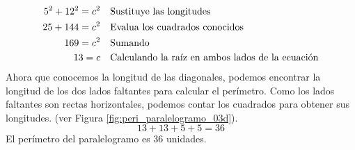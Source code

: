 \begin{solutionbox}{14cm}
\begin{minipage}{0.55\textwidth}
\begin{align*}
            5^2+12^2  =c^2 & \text{\quad Sustituye las longitudes}                         \\
            25 +144 =c^2   & \text{\quad Evalua los cuadrados conocidos}                   \\
            169=c^2        & \text{\quad Sumando }                                         \\
            13=c           & \text{\quad Calculando la raíz en ambos lados de la ecuación} \\
        \end{align*}
        Ahora que conocemos la longitud de las diagonales, podemos encontrar la longitud de los dos lados faltantes para calcular el perímetro.
        Como los lados faltantes son rectas horizontales, podemos contar los cuadrados para obtener sus longitudes. (ver Figura \ref{fig:peri_paralelogramo_03d}).
        \[13+13+5+5=36\]
        El perímetro del paralelogramo es 36 unidades.
    \end{minipage}
\end{solutionbox}
